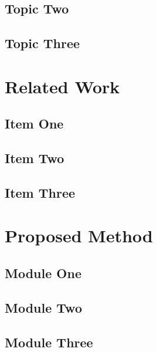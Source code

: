 \documentclass[letterpaper,12pt]{article}
\begin{document}
\subsection{Topic Two}

\subsection{Topic Three}

\section{Related Work}

\subsection{Item One}

\subsection{Item Two}

\subsection{Item Three}

\section{Proposed Method}

\subsection{Module One}

\subsection{Module Two}

\subsection{Module Three}
\end{document}

